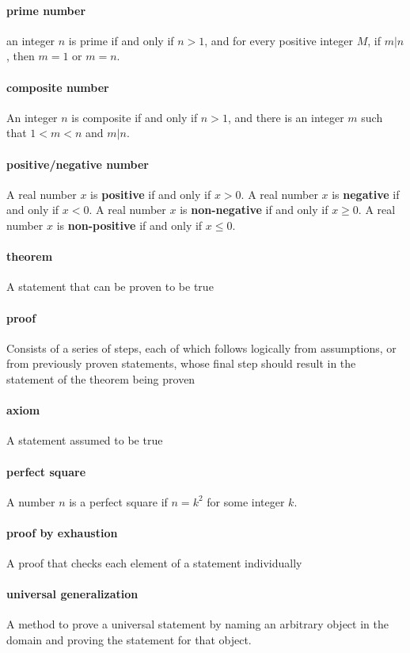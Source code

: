 \documentclass[a4paper]{article}
\begin{document}
\paragraph{prime number} an integer $n$ is prime if and only if $n > 1$, and for every positive integer $M$, if $m|n$, then $m = 1$ or $m = n$.
\paragraph{composite number} An integer $n$ is composite if and only if $n > 1$, and there is an integer $m$ such that $1 < m < n$ and $m|n$.
\paragraph{positive/negative number} A real number $x$ is \textbf{positive} if and only if $x > 0$. A real number $x$ is \textbf{negative} if and only if $x < 0$. A real number $x$ is \textbf{non-negative} if and only if $x \geq 0$. A real number $x$ is \textbf{non-positive} if and only if $x \leq 0$.
\paragraph{theorem} A statement that can be proven to be true
\paragraph{proof} Consists of a series of steps, each of which follows logically from assumptions, or from previously proven statements, whose final step should result in the statement of the theorem being proven
\paragraph{axiom} A statement assumed to be true
\paragraph{perfect square} A number $n$ is a perfect square if $n = k^2$ for some integer $k$.
\paragraph{proof by exhaustion} A proof that checks each element of a statement individually
\paragraph{universal generalization} A method to prove a universal statement by naming an arbitrary object in the domain and proving the statement for that object.
\end{document}

